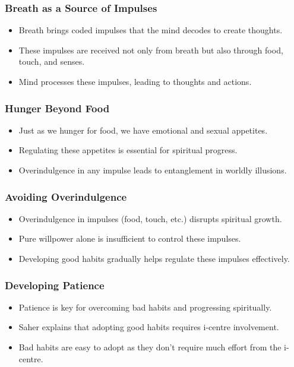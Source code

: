 \begin{frame}[fragile]\frametitle{Breath as a Source of Impulses}
    \begin{itemize}
        \item Breath brings coded impulses that the mind decodes to create thoughts.
        \item These impulses are received not only from breath but also through food, touch, and senses.
        \item Mind processes these impulses, leading to thoughts and actions.
    \end{itemize}
\end{frame}

\begin{frame}[fragile]\frametitle{Hunger Beyond Food}
    \begin{itemize}
        \item Just as we hunger for food, we have emotional and sexual appetites.
        \item Regulating these appetites is essential for spiritual progress.
        \item Overindulgence in any impulse leads to entanglement in worldly illusions.
    \end{itemize}
\end{frame}

\begin{frame}[fragile]\frametitle{Avoiding Overindulgence}
    \begin{itemize}
        \item Overindulgence in impulses (food, touch, etc.) disrupts spiritual growth.
        \item Pure willpower alone is insufficient to control these impulses.
        \item Developing good habits gradually helps regulate these impulses effectively.
    \end{itemize}
\end{frame}

\begin{frame}[fragile]\frametitle{Developing Patience}
    \begin{itemize}
        \item Patience is key for overcoming bad habits and progressing spiritually.
        \item Saher explains that adopting good habits requires i-centre involvement.
        \item Bad habits are easy to adopt as they don’t require much effort from the i-centre.
    \end{itemize}
\end{frame}

